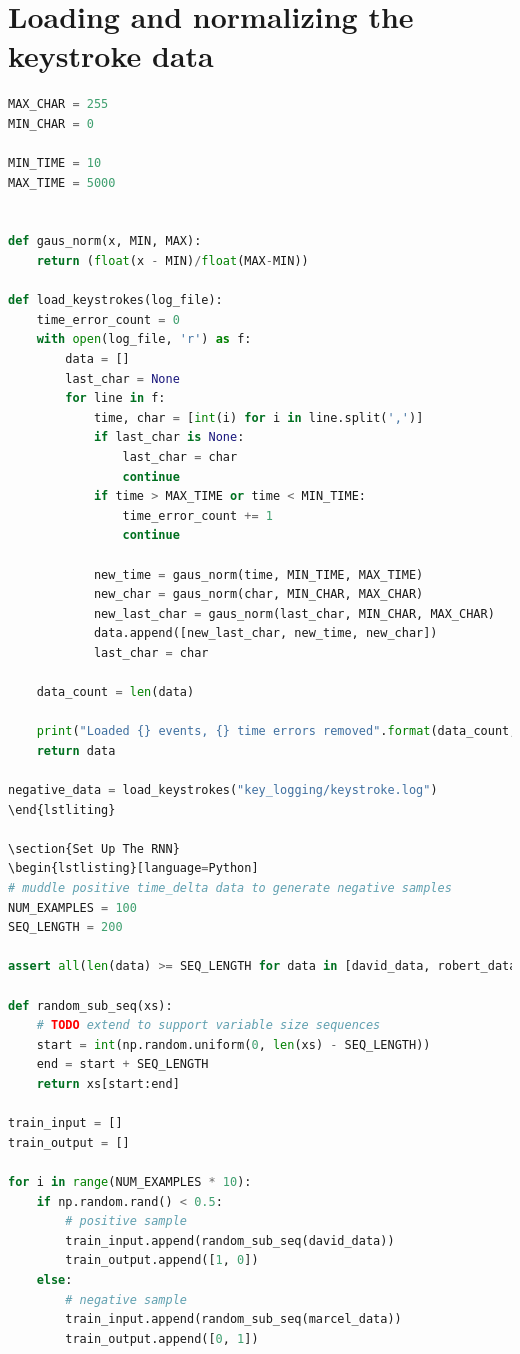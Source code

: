 \documentclass[fancychapters]{report}
\begin{document}
\section{Loading and normalizing the keystroke data}
\begin{lstlisting}[language=Python]
MAX_CHAR = 255
MIN_CHAR = 0

MIN_TIME = 10
MAX_TIME = 5000


def gaus_norm(x, MIN, MAX):
    return (float(x - MIN)/float(MAX-MIN))

def load_keystrokes(log_file):
    time_error_count = 0
    with open(log_file, 'r') as f:
        data = []
        last_char = None
        for line in f:
            time, char = [int(i) for i in line.split(',')]
            if last_char is None:
                last_char = char
                continue
            if time > MAX_TIME or time < MIN_TIME:
                time_error_count += 1
                continue
            
            new_time = gaus_norm(time, MIN_TIME, MAX_TIME)
            new_char = gaus_norm(char, MIN_CHAR, MAX_CHAR)
            new_last_char = gaus_norm(last_char, MIN_CHAR, MAX_CHAR)
            data.append([new_last_char, new_time, new_char])
            last_char = char

    data_count = len(data)

    print("Loaded {} events, {} time errors removed".format(data_count, time_error_count))
    return data

negative_data = load_keystrokes("key_logging/keystroke.log")
\end{lstliting}

\section{Set Up The RNN}
\begin{lstlisting}[language=Python]
# muddle positive time_delta data to generate negative samples
NUM_EXAMPLES = 100
SEQ_LENGTH = 200

assert all(len(data) >= SEQ_LENGTH for data in [david_data, robert_data, marcel_data]), 'need at least SEQ_LENGTH events'

def random_sub_seq(xs):
    # TODO extend to support variable size sequences
    start = int(np.random.uniform(0, len(xs) - SEQ_LENGTH))
    end = start + SEQ_LENGTH
    return xs[start:end]

train_input = []
train_output = []

for i in range(NUM_EXAMPLES * 10):
    if np.random.rand() < 0.5:
        # positive sample
        train_input.append(random_sub_seq(david_data))
        train_output.append([1, 0])
    else:
        # negative sample
        train_input.append(random_sub_seq(marcel_data))
        train_output.append([0, 1])


\end{lstlisting}
\end{document}
